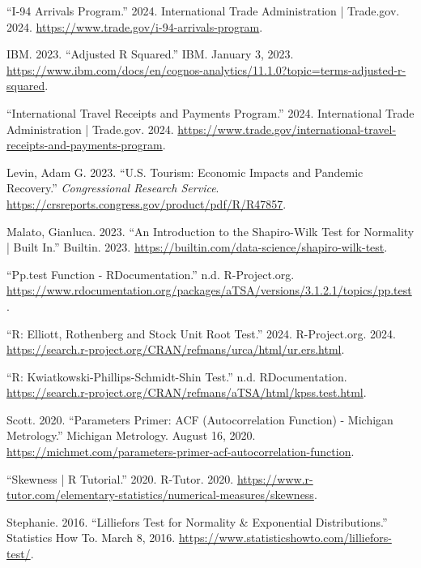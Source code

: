 \documentclass[11pt]{article}
\newenvironment{references}
  {\begin{list}{}{%
      \setlength{\leftmargin}{0.4in}%
      \setlength{\itemindent}{-0.4in}%
      \setlength{\itemsep}{0.6\baselineskip}%
      \setlength{\parsep}{0pt}%
  }}
  {\end{list}}
\begin{document}
\begin{references}
\item ``I-94 Arrivals Program.'' 2024. International Trade Administration | Trade.gov. 2024. \url{https://www.trade.gov/i-94-arrivals-program}.

\item IBM. 2023. ``Adjusted R Squared.'' IBM. January 3, 2023. \url{https://www.ibm.com/docs/en/cognos-analytics/11.1.0?topic=terms-adjusted-r-squared}.

\item ``International Travel Receipts and Payments Program.'' 2024. International Trade Administration | Trade.gov. 2024. \url{https://www.trade.gov/international-travel-receipts-and-payments-program}.

\item Levin, Adam G. 2023. ``U.S. Tourism: Economic Impacts and Pandemic Recovery.'' \emph{Congressional Research Service}. \url{https://crsreports.congress.gov/product/pdf/R/R47857}.

\item Malato, Gianluca. 2023. ``An Introduction to the Shapiro-Wilk Test for Normality | Built In.'' Builtin. 2023. \url{https://builtin.com/data-science/shapiro-wilk-test}.

\item ``Pp.test Function - RDocumentation.'' n.d. R-Project.org. \url{https://www.rdocumentation.org/packages/aTSA/versions/3.1.2.1/topics/pp.test}.

\item ``R: Elliott, Rothenberg and Stock Unit Root Test.'' 2024. R-Project.org. 2024. \url{https://search.r-project.org/CRAN/refmans/urca/html/ur.ers.html}.

\item ``R: Kwiatkowski-Phillips-Schmidt-Shin Test.'' n.d. RDocumentation. \url{https://search.r-project.org/CRAN/refmans/aTSA/html/kpss.test.html}.

\item Scott. 2020. ``Parameters Primer: ACF (Autocorrelation Function) - Michigan Metrology.'' Michigan Metrology. August 16, 2020. \url{https://michmet.com/parameters-primer-acf-autocorrelation-function}.

\item ``Skewness | R Tutorial.'' 2020. R-Tutor. 2020. \url{https://www.r-tutor.com/elementary-statistics/numerical-measures/skewness}.

\item Stephanie. 2016. ``Lilliefors Test for Normality \& Exponential Distributions.'' Statistics How To. March 8, 2016. \url{https://www.statisticshowto.com/lilliefors-test/}.


\end{references}
\end{document}
